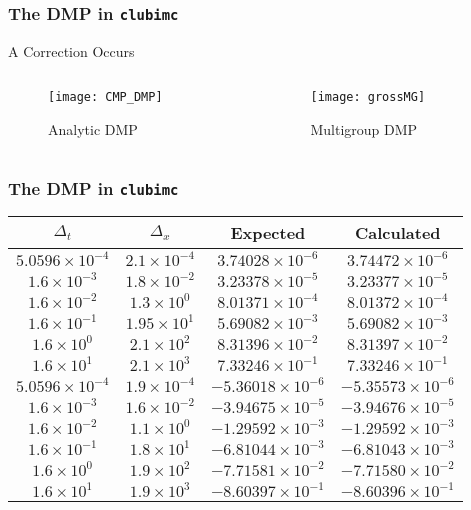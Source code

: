 \documentclass{beamer}
\begin{document}
\begin{frame}\frametitle{The DMP in \texttt{clubimc}}
A Correction Occurs
\begin{columns}
\begin{column}{.5\textwidth}
\begin{figure}
\texttt{[image: CMP\_DMP]}
\caption{Analytic DMP}
\end{figure}
\end{column}
\begin{column}{.5\textwidth}
\begin{figure}
\texttt{[image: grossMG]}
\caption{Multigroup DMP}
\end{figure}
\end{column}
\end{columns}
\end{frame}

\begin{frame}\frametitle{The DMP in \texttt{clubimc}}
\begin{tabular}{c c c c}
$\Delta_t$ & $\Delta_x$ & Expected & Calculated \\ \hline
$5.0596\times10^{-4}$ & $2.1\times10^{-4}$ & $3.74028\times10^{-6}$ &
  $3.74472\times10^{-6}$ \\
$1.6\times10^{-3}$ & $1.8\times10^{-2}$ & $3.23378\times10^{-5}$ &
  $3.23377\times10^{-5}$ \\
$1.6\times10^{-2}$ & $1.3\times10^{0}$ & $8.01371\times10^{-4}$ &
  $8.01372\times10^{-4}$ \\
$1.6\times10^{-1}$ & $1.95\times10^{1}$ & $5.69082\times10^{-3}$ &
  $5.69082\times10^{-3}$ \\
$1.6\times10^{0}$ & $2.1\times10^{2}$ & $8.31396\times10^{-2}$ &
  $8.31397\times10^{-2}$ \\
$1.6\times10^{1}$ & $2.1\times10^{3}$ & $7.33246\times10^{-1}$ &
  $7.33246\times10^{-1}$ \\ \hline
$5.0596\times10^{-4}$ & $1.9\times10^{-4}$ & $-5.36018\times10^{-6}$ &
  $-5.35573\times10^{-6}$ \\
$1.6\times10^{-3}$ & $1.6\times10^{-2}$ & $-3.94675\times10^{-5}$ &
  $-3.94676\times10^{-5}$ \\
$1.6\times10^{-2}$ & $1.1\times10^{0}$ & $-1.29592\times10^{-3}$ &
  $-1.29592\times10^{-3}$ \\
$1.6\times10^{-1}$ & $1.8\times10^{1}$ & $-6.81044\times10^{-3}$ &
  $-6.81043\times10^{-3}$ \\
$1.6\times10^{0}$ & $1.9\times10^{2}$ & $-7.71581\times10^{-2}$ &
  $-7.71580\times10^{-2}$ \\
$1.6\times10^{1}$ & $1.9\times10^{3}$ & $-8.60397\times10^{-1}$ &
  $-8.60396\times10^{-1}$ 
\end{tabular}
\end{frame}
\end{document}
